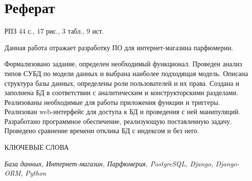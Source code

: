 \chapter*{Реферат}

РПЗ 44 с., 17 рис., 3 табл., 9 ист.

Данная работа отражает разработку ПО для интернет-магазина парфюмерии.

Формализовано задание, определен необходимый функционал. Проведен анализ типов СУБД по модели данных и выбрана наиболее подходящая модель. Описана структура базы данных, определены роли пользователей и их права. Создана и заполнена БД в соответствии с аналитическим и конструкторскими разделами. Реализованы необходимые для работы приложения функции и триггеры. Реализован web-интерфейс для доступа к БД и проведения с ней манипуляций. Разработано программное обеспечение, реализующую поставленную задачу. Проведено сравнение времени отклика БД с индексом и без него.

КЛЮЧЕВЫЕ СЛОВА

\textit{База данных, Интернет-магазин, Парфюмерия, PostgreSQL, Django, \newline Django-ORM, Python}